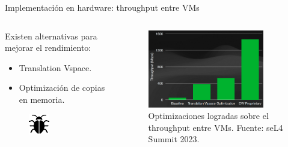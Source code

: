 \documentclass[serif, aspectratio=169]{beamer}
\begin{document}
\begin{frame}{Implementación en hardware: throughput entre VMs}
\begin{columns}[T]
    \begin{column}{0.50\textwidth}
    Existen alternativas para mejorar el rendimiento:
    \begin{itemize}
        \item Translation Vspace.
        \item Optimización de copias en memoria.
    \end{itemize}
    \begin{figure}
        \centering
        \includegraphics[width=0.35\textwidth]{images/bug.png}
    \end{figure}

    \end{column}
    \begin{column}{0.45\textwidth}
        \begin{figure}
            \centering
            \includegraphics[width=0.85\textwidth]{images/throughput_improve.png}
            \caption{\centering Optimizaciones logradas sobre el throughput entre VMs. \hspace{4cm} \footnotesize{Fuente: seL4 Summit 2023.}}
        \end{figure}
    \end{column}
\end{columns}
\end{frame}
\end{document}
